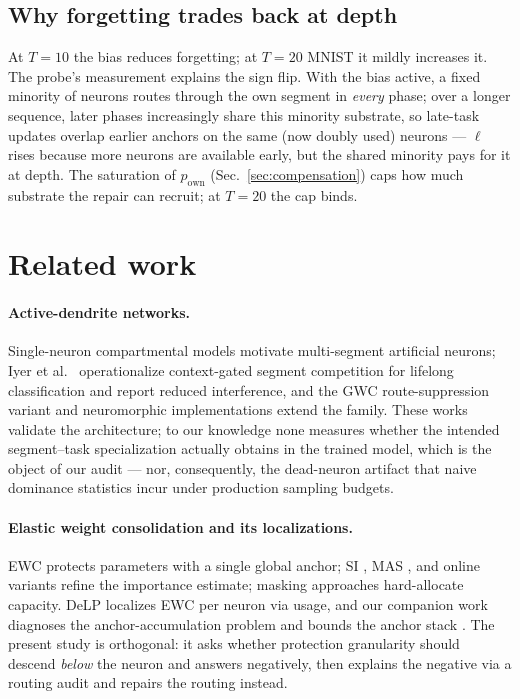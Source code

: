 \documentclass[review,12pt,number]{elsarticle}
\newcommand{\delp}{DeLP}
\newcommand{\own}{p_{\mathrm{own}}}
\begin{document}
\subsection{Why forgetting trades back at depth}
\label{sec:depthbwt}

At $T{=}10$ the bias reduces forgetting; at $T{=}20$ MNIST it mildly
increases it. The probe's measurement explains the sign flip. With the
bias active, a fixed minority of neurons routes through the own segment in
\emph{every} phase; over a longer sequence, later phases increasingly
share this minority substrate, so late-task updates overlap earlier
anchors on the same (now doubly used) neurons --- $\ell$ rises because
more neurons are available early, but the shared minority pays for it at
depth. The saturation of $\own$ (Sec.~\ref{sec:compensation}) caps how
much substrate the repair can recruit; at $T{=}20$ the cap binds.

\section{Related work}
\label{sec:related}

\paragraph{Active-dendrite networks.} Single-neuron compartmental models
\cite{poirazi2003,london2005,poirazi2020,ujfalussy2018} motivate
multi-segment artificial neurons; Iyer et al.\ \cite{iyer2022} operationalize
context-gated segment competition for lifelong classification and report
reduced interference, and the GWC route-suppression variant
\cite{boyle2025,baek2024} and neuromorphic implementations
\cite{boahen2022} extend the family. These works validate the architecture;
to our knowledge none measures whether the intended segment--task
specialization actually obtains in the trained model, which is the object
of our audit --- nor, consequently, the dead-neuron artifact that
naive dominance statistics incur under production sampling budgets.

\paragraph{Elastic weight consolidation and its localizations.} EWC
\cite{kirkpatrick2017} protects parameters with a single global anchor;
SI \cite{zenke2017}, MAS \cite{aljundi2018}, and online variants
\cite{chaudhry2018} refine the importance estimate; masking approaches
\cite{mallya2018,serra2018,masse2018} hard-allocate capacity. \delp{}
\cite{zhou2026delp} localizes EWC per neuron via usage, and our companion
work diagnoses the anchor-accumulation problem and bounds the anchor stack
\cite{zhou2026delp}. The present study is orthogonal: it asks whether
protection granularity should descend \emph{below} the neuron and answers
negatively, then explains the negative via a routing audit and repairs the
routing instead.
\end{document}
